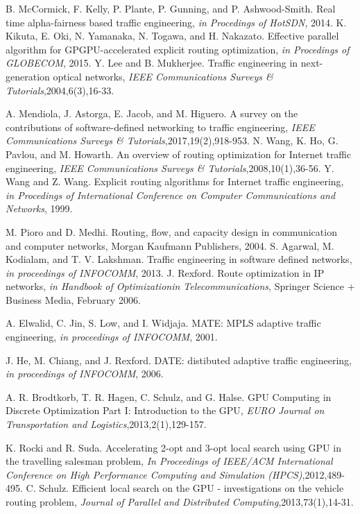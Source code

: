 \documentclass[master]{thesis-uestc}
\begin{document}
\begin{thebibliography}{1}
B. McCormick, F. Kelly, P. Plante, P. Gunning, and P. Ashwood-Smith. Real time alpha-fairness based traffic engineering, \emph{in Procedings of HotSDN}, 2014.
K. Kikuta, E. Oki, N. Yamanaka, N. Togawa, and H. Nakazato. Effective parallel algorithm for GPGPU-accelerated explicit routing optimization, \emph{in Procedings of GLOBECOM}, 2015.
Y. Lee and B. Mukherjee. Traffic engineering in next-generation optical networks, \emph{IEEE Communications Surveys \& Tutorials},2004,6(3),16-33.

A. Mendiola, J. Astorga, E. Jacob, and M. Higuero. A survey on the contributions of software-defined networking to traffic engineering, \emph{IEEE Communications Surveys \& Tutorials},2017,19(2),918-953.
N. Wang, K. Ho, G. Pavlou, and M. Howarth. An overview of routing optimization for Internet traffic engineering, \emph{IEEE Communications Surveys \& Tutorials},2008,10(1),36-56.
Y. Wang and Z. Wang. Explicit routing algorithms for Internet traffic engineering, \emph{in Procedings of International Conference on Computer Communications and Networks}, 1999.

M. Pioro and D. Medhi. Routing, flow, and capacity design in communication and computer networks, Morgan Kaufmann Publishers, 2004.
S. Agarwal, M. Kodialam, and T. V. Lakshman. Traffic engineering in software defined networks, \emph{in proceedings of INFOCOMM}, 2013.
J. Rexford. Route optimization in IP networks, \emph{in Handbook of Optimizationin Telecommunications}, Springer Science + Business Media, February 2006.

A. Elwalid, C. Jin, S. Low, and I. Widjaja. MATE: MPLS adaptive traffic engineering, \emph{in proceedings of INFOCOMM}, 2001.

J. He, M. Chiang, and J. Rexford. DATE: distibuted adaptive traffic engineering, \emph{in proceedings of INFOCOMM}, 2006.

A. R. Brodtkorb, T. R. Hagen, C. Schulz, and G. Halse. GPU Computing in Discrete Optimization Part I: Introduction to the GPU, \emph{EURO Journal on Transportation and Logistics},2013,2(1),129-157.

K. Rocki and R. Suda. Accelerating 2-opt and 3-opt local search using GPU in the travelling salesman problem, \emph{In Proceedings of IEEE/ACM International Conference on High Performance Computing
and Simulation (HPCS)},2012,489-495.
C. Schulz. Efficient local search on the GPU - investigations on the vehicle routing problem, \emph{Journal of Parallel and Distributed Computing},2013,73(1),14-31.


\end{thebibliography}
\end{document}
